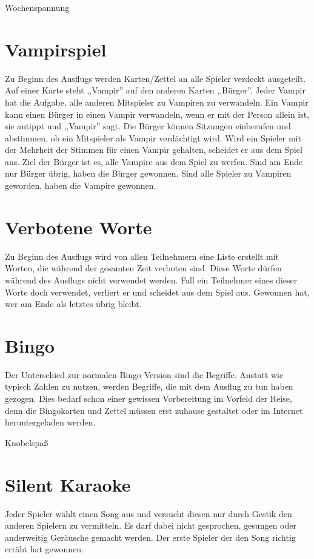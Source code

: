 \documentclass[a4paper]{report}
\begin{document}
\begin{center}%
    \huge Wochenspannung
\end{center}

\section*{Vampirspiel}
Zu Beginn des Ausflugs werden Karten/Zettel an alle Spieler verdeckt ausgeteilt. Auf einer Karte steht ,,Vampir'' auf den anderen Karten ,,Bürger''. Jeder Vampir hat die Aufgabe, alle anderen Mitspieler zu Vampiren zu verwandeln. Ein Vampir kann einen Bürger in einen Vampir verwandeln, wenn er mit der Person allein ist, sie antippt und ,,Vampir'' sagt. Die Bürger können Sitzungen einberufen und abstimmen, ob ein Mitspieler als Vampir verdächtigt wird. Wird ein Spieler mit der Mehrheit der Stimmen für einen Vampir gehalten, scheidet er aus dem Spiel aus. Ziel der Bürger ist es, alle Vampire aus dem Spiel zu werfen. Sind am Ende nur Bürger übrig, haben die Bürger gewonnen. Sind alle Spieler zu Vampiren geworden, haben die Vampire gewonnen.

\section*{Verbotene Worte}
Zu Beginn des Ausflugs wird von allen Teilnehmern eine Liste erstellt mit Worten, die während der gesamten Zeit verboten sind. Diese Worte dürfen während des Ausflugs nicht verwendet werden. Fall ein Teilnehmer eines dieser Worte doch verwendet, verliert er und scheidet aus dem Spiel aus. Gewonnen hat, wer am Ende als letztes übrig bleibt.

\section*{Bingo}
Der Unterschied zur normalen Bingo Version sind die Begriffe. Anstatt wie typisch Zahlen zu nutzen, werden Begriffe, die mit dem Ausflug zu tun haben gezogen. Dies bedarf schon einer gewissen Vorbereitung im Vorfeld der Reise, denn die Bingokarten und Zettel müssen erst zuhause gestaltet oder im Internet heruntergeladen werden.

\noindent\makebox[\linewidth]{\rule{\paperwidth}{0.4pt}}
\begin{center}%
    \huge Knobelspaß
\end{center}

\section*{Silent Karaoke}
Jeder Spieler wählt einen Song aus und versucht diesen nur durch Gestik den anderen Spielern zu vermitteln. Es darf dabei nicht gesprochen, gesungen oder anderweitig Geräusche gemacht werden. Der erste Spieler der den Song richtig erräht hat gewonnen.
\end{document}
